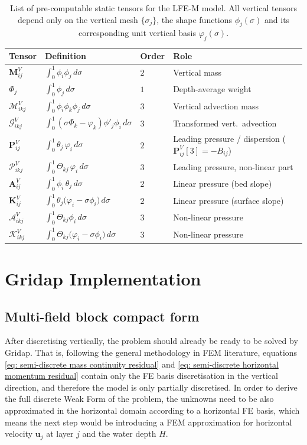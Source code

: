 \documentclass{article}
\newcommand{\uj}{\mathbf{u}_j}
\newcommand{\VMij}{\mathbf{M}_{ij}^V}
\newcommand{\VAij}{\mathbf{A}_{ij}^V}
\newcommand{\VKij}{\mathbf{K}_{ij}^V}
\newcommand{\VMikj}{\boldsymbol{\mathcal{M}}_{ikj}^V}
\newcommand{\VGikj}{\boldsymbol{\mathcal{G}}_{ikj}^V}
\newcommand{\VAikj}{\boldsymbol{\mathcal{A}}_{ikj}^V}
\newcommand{\VKikj}{\boldsymbol{\mathcal{K}}_{ikj}^V}
\newcommand{\VPij}{\mathbf{P}_{ij}^V}
\newcommand{\VPikj}{\boldsymbol{\mathcal{P}}_{ikj}^V}
\begin{document}
\begin{table}[H]
\centering
\renewcommand{\arraystretch}{1.45}
\begin{tabular}{llll}
\toprule
Tensor & Definition & Order & Role \\
\midrule
$\VMij$ & $\int_0^1\phi_i\phi_j\,d\sigma$ & $2$ & Vertical mass \\
$\Phi_j$ & $\int_0^1\phi_j\,d\sigma$ & $1$ & Depth-average weight \\
$\VMikj$ & $\int_0^1\phi_i\phi_k\phi_j\,d\sigma$ & $3$ & Vertical advection mass \\
$\VGikj$ & $\int_0^1(\sigma\Phi_k-\varphi_k)\phi'_j\phi_i\,d\sigma$ & $3$ & Transformed vert.\ advection \\
$\VPij$ & $\int_0^1\theta_j\,\varphi_i\,d\sigma$ & $2$ & Leading pressure / dispersion ($\VPij[3]=-B_{ij}$) \\
$\VPikj$ & $\int_0^1\Theta_{kj}\,\varphi_i\,d\sigma$ & $3$ & Leading pressure, non-linear part \\
$\VAij$ & $\int_0^1\phi_i\,\theta_j\,d\sigma$ & $2$ & Linear pressure (bed slope) \\
$\VKij$ & $ \int_0^1 \theta_j \big(\varphi_i-\sigma \phi_i \big) \, d\sigma$ & $2$ & Linear pressure (surface slope) \\
$\VAikj$ & $\int_0^1\Theta_{kj}\phi_i\,d\sigma$ & $3$ & Non-linear pressure \\
$\VKikj$ & $\int_0^1  \Theta_{kj} \big( \varphi_i-\sigma \phi_i \big)\, d\sigma$ & $3$ & Non-linear pressure \\
\bottomrule
\end{tabular}
\caption{List of pre-computable static tensors for the LFE-M model. All vertical tensors depend only on the vertical mesh $\{\sigma_j\}$, the shape functions $\phi_j(\sigma)$ and its corresponding unit vertical basis $\varphi_j(\sigma)$.}
\label{tab: vertical tensors}
\end{table}

\section{Gridap Implementation}

\subsection*{Multi-field block compact form}

After discretising vertically, the problem should already be ready to be solved by Gridap. 
That is, following the general methodology in FEM literature, equations \eqref{eq: semi-discrete mass continuity residual} and \eqref{eq: semi-discrete horizontal momentum residual} contain only the FE basis discretisation in the vertical direction, and therefore the model is only partially discretised. 
In order to derive the full discrete Weak Form of the problem, the unknowns need to be also approximated in the horizontal domain according to a horizontal FE basis, which means the next step would be introducing a FEM approximation for horizontal velocity $\uj$ at layer $j$ and the water depth $H$. 
\end{document}
